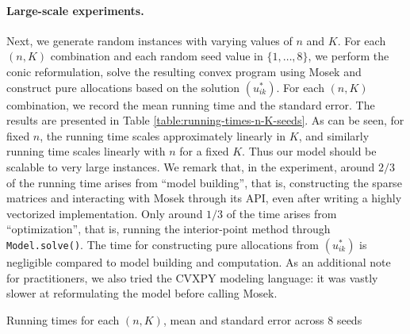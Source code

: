 \paragraph{Large-scale experiments.} 
Next, we generate random instances with varying values of $n$ and $K$.
For each $(n,K)$ combination and each random seed value in $\{ 1, \dots, 8\}$, we perform the conic reformulation, solve the resulting convex program using Mosek and construct pure allocations based on the solution $(u^*_{ik})$.
For each $(n,K)$ combination, we record the mean running time and the standard error.
The results are presented in Table \ref{table:running-times-n-K-seeds}. 
As can be seen, for fixed $n$, the running time scales approximately linearly in $K$, and similarly running time scales linearly with $n$ for a fixed $K$. Thus our model should be scalable to very large instances.
We remark that, in the experiment, around $2/3$ of the running time arises from ``model building'', that is, constructing the sparse matrices and interacting with Mosek through its API, even after writing a highly vectorized implementation. 
Only around $1/3$ of the time arises from ``optimization'', that is, running the interior-point method through \texttt{Model.solve()}. The time for constructing pure allocations from $(u^*_{ik})$ is negligible compared to model building and computation. As an additional note for practitioners, we also tried the CVXPY modeling language: it was vastly slower at reformulating the model before calling Mosek.

\begin{table}
	\begin{center}
		
		\caption{Running times for each $(n,K)$, mean and standard error across $8$ seeds} 
		\label{table:running-times-n-K-seeds}
	\end{center}
\end{table}